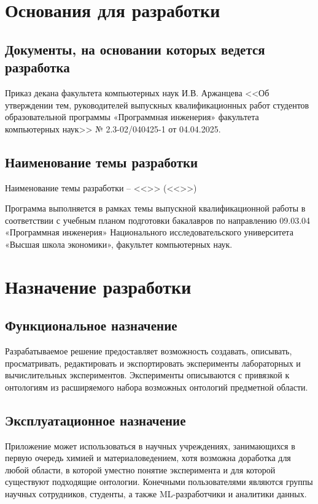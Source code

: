 \documentclass[a4paper,12pt,reqno]{article}
\begin{document}
    \section{Основания для разработки}

    \subsection{Документы, на основании которых ведется разработка}
    Приказ декана факультета компьютерных наук И.В. Аржанцева <<Об утверждении тем, руководителей выпускных квалификационных работ студентов образовательной программы «Программная инженерия» факультета компьютерных наук>> № 2.3-02/040425-1 от 04.04.2025.

    \subsection{Наименование темы разработки}
    Наименование темы разработки – <<\unskip>> (<<\unskip>>)

    Программа выполняется в рамках темы выпускной квалификационной работы в соответствии с учебным планом подготовки бакалавров по направлению 09.03.04 «Программная инженерия» Национального исследовательского университета «Высшая школа экономики», факультет компьютерных наук.
    \newpage


    \section{Назначение разработки}

    \subsection{Функциональное назначение}
    Разрабатываемое решение предоставляет возможность создавать, описывать, просматривать, редактировать и экспортировать эксперименты лабораторных и вычислительных экспериментов. Эксперименты описываются с привязкой к онтологиям из расширяемого набора возможных онтологий предметной области.

    \subsection{Эксплуатационное назначение}
    Приложение может использоваться в научных учреждениях, занимающихся в первую очередь химией и материаловедением, хотя возможна доработка для любой области, в которой уместно понятие эксперимента и для которой существуют подходящие онтологии. Конечными пользователями являются группы научных сотрудников, студенты, а также ML-разработчики и аналитики данных.
    \newpage
\end{document}
